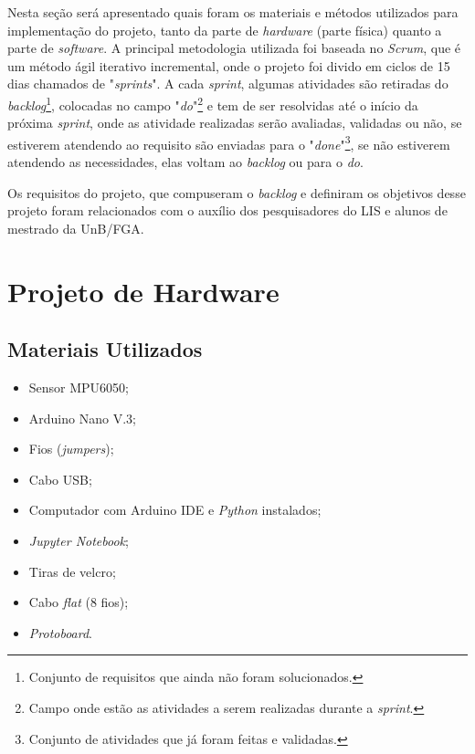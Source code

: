 Nesta seção será apresentado quais foram os materiais e métodos utilizados para implementação do projeto, tanto da parte de \textit{hardware} (parte física) quanto a parte de \textit{software}. A principal metodologia utilizada foi baseada  no \textit{Scrum}, que é um método ágil iterativo incremental, onde o projeto foi divido em ciclos de 15 dias chamados de "\textit{sprints}". A cada \textit{sprint}, algumas atividades são retiradas do \textit{backlog}\footnote{Conjunto de requisitos que ainda não foram solucionados.}, colocadas no campo "\textit{do}"\footnote{Campo onde estão as atividades a serem realizadas durante a \textit{sprint}.}  e tem de ser resolvidas até o início da próxima \textit{sprint}, onde as atividade realizadas serão avaliadas,  validadas ou não, se estiverem atendendo ao requisito são enviadas para o "\textit{done}"\footnote{Conjunto de atividades que já foram feitas e validadas.}, se não estiverem atendendo as necessidades, elas voltam ao \textit{backlog} ou para o \textit{do}.

Os requisitos do projeto, que compuseram o \textit{backlog} e definiram os objetivos desse projeto foram relacionados com o auxílio dos pesquisadores do LIS e alunos de mestrado da UnB/FGA.

\section{Projeto de Hardware}


 
	\subsection{Materiais Utilizados}
		\begin{itemize}
			
			\item Sensor MPU6050;
			\item Arduino Nano V.3;
			\item Fios (\textit{jumpers});
			\item Cabo USB;
			\item Computador com Arduino IDE e \textit{Python} instalados;
			\item \textit{Jupyter Notebook};
			\item Tiras de velcro;
			\item Cabo \textit{flat} (8 fios);
			\item \textit{Protoboard}.
			
		\end{itemize}	
	 
